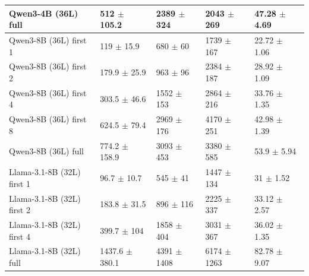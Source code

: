 \begin{tabular}{lllll}
 Qwen3-4B (36L) full        & 512 {\small $\pm$ 105.2}    & 2389 {\small $\pm$ 324}  & 2043 {\small $\pm$ 269}  & 47.28 {\small $\pm$ 4.69} \\
 \midrule
 Qwen3-8B (36L) first 1     & 119 {\small $\pm$ 15.9}     & 680 {\small $\pm$ 60}    & 1739 {\small $\pm$ 167}  & 22.72 {\small $\pm$ 1.06} \\
 Qwen3-8B (36L) first 2     & 179.9 {\small $\pm$ 25.9}   & 963 {\small $\pm$ 96}    & 2384 {\small $\pm$ 187}  & 28.92 {\small $\pm$ 1.09} \\
 Qwen3-8B (36L) first 4     & 303.5 {\small $\pm$ 46.6}   & 1552 {\small $\pm$ 153}  & 2864 {\small $\pm$ 216}  & 33.76 {\small $\pm$ 1.35} \\
 Qwen3-8B (36L) first 8     & 624.5 {\small $\pm$ 79.4}   & 2969 {\small $\pm$ 176}  & 4170 {\small $\pm$ 251}  & 42.98 {\small $\pm$ 1.39} \\
 Qwen3-8B (36L) full        & 774.2 {\small $\pm$ 158.9}  & 3093 {\small $\pm$ 453}  & 3380 {\small $\pm$ 585}  & 53.9 {\small $\pm$ 5.94}  \\
 \midrule
 Llama-3.1-8B (32L) first 1 & 96.7 {\small $\pm$ 10.7}    & 545 {\small $\pm$ 41}    & 1447 {\small $\pm$ 134}  & 31 {\small $\pm$ 1.52}    \\
 Llama-3.1-8B (32L) first 2 & 183.8 {\small $\pm$ 31.5}   & 896 {\small $\pm$ 116}   & 2225 {\small $\pm$ 337}  & 33.12 {\small $\pm$ 2.57} \\
 Llama-3.1-8B (32L) first 4 & 399.7 {\small $\pm$ 104}    & 1858 {\small $\pm$ 404}  & 3031 {\small $\pm$ 367}  & 36.02 {\small $\pm$ 1.35} \\
 Llama-3.1-8B (32L) full    & 1437.6 {\small $\pm$ 380.1} & 4391 {\small $\pm$ 1408} & 6174 {\small $\pm$ 1263} & 82.78 {\small $\pm$ 9.07} \\
\bottomrule
\end{tabular}
